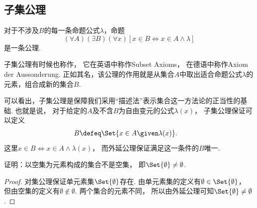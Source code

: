 \subsection{子集公理}
\begin{axiom}[子集公理]
对于不涉及\(B\)的每一条命题公式\(\lambda\)，命题\begin{equation*}
	(\forall A)(\exists B)(\forall x)
	[x \in B \iff x \in A \land \lambda]
\end{equation*}是一条公理.
\end{axiom}
子集公理有时候也称作，
它在英语中称作Subset Axioms，
在德语中称作Axiom der Aussonderung.
正如其名，该公理的作用就是从集合\(A\)中取出适合命题公式\(\lambda\)的元素，组合成新的集合\(B\).

可以看出，子集公理是保障我们采用“描述法”表示集合这一方法论的正当性的基础.
也就是说，
对于给定的\(A\)及不含\(B\)为自由变元的公式\(\lambda(x)\)，
子集公理保证可以定义
\begin{align*}
    B &\defeq \Set{x\in A\given\lambda(x)}.
\end{align*}
这里\(x\in B\iff x\in A\land\lambda(x)\)，
而外延公理保证满足这一条件的\(B\)唯一.

\begin{example}
    证明：以空集为元素构成的集合不是空集，
    即\(\Set{\emptyset}\neq\emptyset\).
    \begin{proof}
        对集公理保证单元素集\(\Set{\emptyset}\)存在.
        由单元素集的定义有\(\emptyset\in\Set{\emptyset}\)，
        但由空集的定义有\(\emptyset\notin\emptyset\).
        两个集合的元素不同，
        所以由外延公理可知\(\Set{\emptyset}\neq\emptyset\).
    \end{proof}
\end{example}

